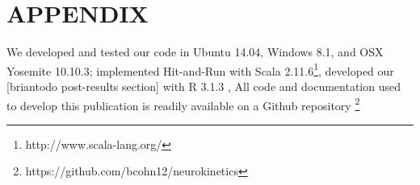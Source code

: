 \section{APPENDIX}

We developed and tested our code in  Ubuntu 14.04, Windows 8.1, and OSX Yosemite 10.10.3; implemented Hit-and-Run with Scala 2.11.6\footnote{http://www.scala-lang.org/}, developed our [briantodo post-results section] with R 3.1.3 \cite{rCoreCitation}, All code and documentation used to develop this publication is readily available on a Github repository \footnote{https://github.com/bcohn12/neurokinetics}
